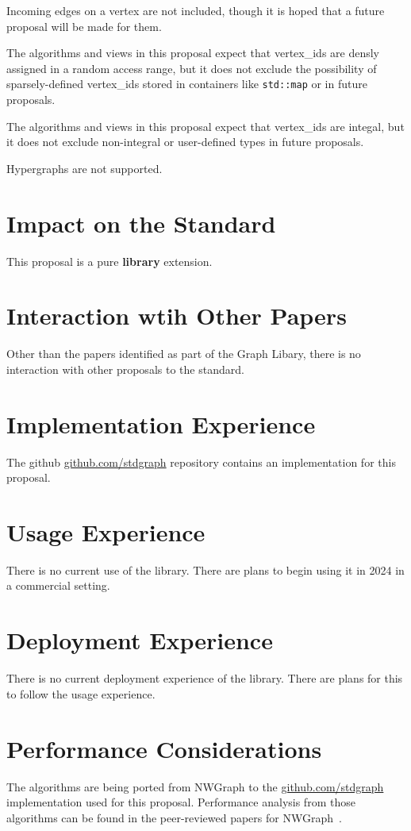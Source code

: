 Incoming edges on a vertex are not included, though it is hoped that a future proposal will be made for them.

The algorithms and views in this proposal expect that vertex\_ids are densly assigned in a random access range, but it does not exclude the possibility of 
sparsely-defined vertex\_ids stored in containers like \lstinline{std::map} or  in future proposals. 

The algorithms and views in this proposal expect that vertex\_ids are integal, but it does not exclude non-integral or user-defined types in future proposals.

Hypergraphs are not supported.

\section{Impact on the Standard}
This proposal is a pure \textbf{library} extension.

\section{Interaction wtih Other Papers}
Other than the papers identified as part of the Graph Libary, there is no interaction with other proposals to the standard.

\section{Implementation Experience}
The github \href{https://github.com/stdgraph}{github.com/stdgraph} repository contains an implementation for this proposal.

\section{Usage Experience}
There is no current use of the library. There are plans to begin using it in 2024 in a commercial setting.

\section{Deployment Experience}
There is no current deployment experience of the library. There are plans for this to follow the usage experience.

\section{Performance Considerations}
The algorithms are being ported from NWGraph to the \href{https://github.com/stdgraph}{github.com/stdgraph} implementation used for this proposal. 
Performance analysis from those algorithms can be found in the peer-reviewed papers for NWGraph~\cite{REF_nwgraph_paper,gapbs_2023}.

